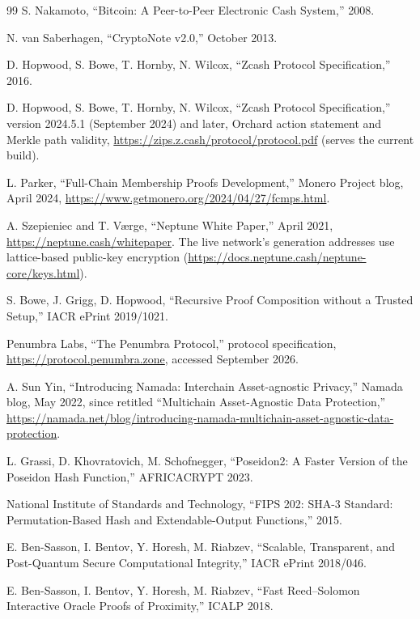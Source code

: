 \documentclass[twocolumn,10pt]{article}
\begin{document}
\begin{thebibliography}{99}
 S. Nakamoto, ``Bitcoin: A Peer-to-Peer Electronic Cash System,'' 2008.

 N. van Saberhagen, ``CryptoNote v2.0,'' October 2013.

 D. Hopwood, S. Bowe, T. Hornby, N. Wilcox, ``Zcash Protocol Specification,'' 2016.

 D. Hopwood, S. Bowe, T. Hornby, N. Wilcox, ``Zcash Protocol Specification,'' version 2024.5.1 (September 2024) and later, Orchard action statement and Merkle path validity, \url{https://zips.z.cash/protocol/protocol.pdf} (serves the current build).

 L. Parker, ``Full-Chain Membership Proofs Development,'' Monero Project blog, April 2024, \url{https://www.getmonero.org/2024/04/27/fcmps.html}.

 A. Szepieniec and T. V{\ae}rge, ``Neptune White Paper,'' April 2021, \url{https://neptune.cash/whitepaper}. The live network's generation addresses use lattice-based public-key encryption (\url{https://docs.neptune.cash/neptune-core/keys.html}).

 S. Bowe, J. Grigg, D. Hopwood, ``Recursive Proof Composition without a Trusted Setup,'' IACR ePrint 2019/1021.

 Penumbra Labs, ``The Penumbra Protocol,'' protocol specification, \url{https://protocol.penumbra.zone}, accessed September 2026.

 A. Sun Yin, ``Introducing Namada: Interchain Asset-agnostic Privacy,'' Namada blog, May 2022, since retitled ``Multichain Asset-Agnostic Data Protection,'' \url{https://namada.net/blog/introducing-namada-multichain-asset-agnostic-data-protection}.

 L. Grassi, D. Khovratovich, M. Schofnegger, ``Poseidon2: A Faster Version of the Poseidon Hash Function,'' AFRICACRYPT 2023.

 National Institute of Standards and Technology, ``FIPS 202: SHA-3 Standard: Permutation-Based Hash and Extendable-Output Functions,'' 2015.

 E. Ben-Sasson, I. Bentov, Y. Horesh, M. Riabzev, ``Scalable, Transparent, and Post-Quantum Secure Computational Integrity,'' IACR ePrint 2018/046.

 E. Ben-Sasson, I. Bentov, Y. Horesh, M. Riabzev, ``Fast Reed--Solomon Interactive Oracle Proofs of Proximity,'' ICALP 2018.


\end{thebibliography}
\end{document}
